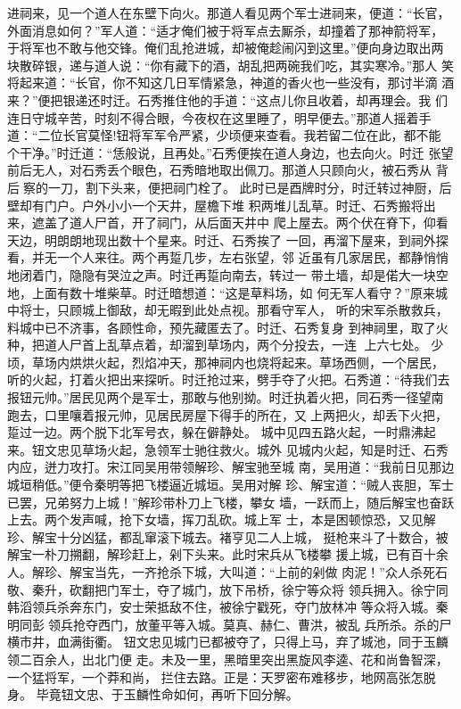进祠来，见一个道人在东壁下向火。那道人看见两个军士进祠来，便道：“长官，
外面消息如何？”军人道：“适才俺们被于将军点去厮杀，却撞着了那神箭将军，
于将军也不敢与他交锋。俺们乱抢进城，却被俺趁闹闪到这里。”便向身边取出两
块散碎银，递与道人说：“你有藏下的酒，胡乱把两碗我们吃，其实寒冷。”那人
笑将起来道：“长官，你不知这几日军情紧急，神道的香火也一些没有，那讨半滴
酒来？”便把银递还时迁。石秀推住他的手道：“这点儿你且收着，却再理会。我
们连日守城辛苦，时刻不得合眼，今夜权在这里睡了，明早便去。”那道人摇着手
道：“二位长官莫怪!钮将军军令严紧，少顷便来查看。我若留二位在此，都不能
个干净。”时迁道：“恁般说，且再处。”石秀便挨在道人身边，也去向火。时迁
张望前后无人，对石秀丢个眼色，石秀暗地取出佩刀。那道人只顾向火，被石秀从
背后察的一刀，割下头来，便把祠门栓了。
此时已是酉牌时分，时迁转过神厨，后壁却有门户。户外小小一个天井，屋檐下堆
积两堆儿乱草。时迁、石秀搬将出来，遮盖了道人尸首，开了祠门，从后面天井中
爬上屋去。两个伏在脊下，仰看天边，明朗朗地现出数十个星来。时迁、石秀挨了
一回，再溜下屋来，到祠外探看，并无一个人来往。两个再踅几步，左右张望，邻
近虽有几家居民，都静悄悄地闭着门，隐隐有哭泣之声。时迁再踅向南去，转过一
带土墙，却是偌大一块空地，上面有数十堆柴草。时迁暗想道：“这是草料场，如
何无军人看守？”原来城中将士，只顾城上御敌，却无暇到此处点视。那看守军人，
听的宋军杀散救兵，料城中已不济事，各顾性命，预先藏匿去了。时迁、石秀复身
到神祠里，取了火种，把道人尸首上乱草点着，却溜到草场内，两个分投去，一连
上六七处。
少顷，草场内烘烘火起，烈焰冲天，那神祠内也烧将起来。草场西侧，一个居民，
听的火起，打着火把出来探听。时迁抢过来，劈手夺了火把。石秀道：“待我们去
报钮元帅。”居民见两个是军士，那敢与他别拗。时迁执着火把，同石秀一径望南
跑去，口里嚷着报元帅，见居民房屋下得手的所在，又上两把火，却丢下火把，
踅过一边。两个脱下北军号衣，躲在僻静处。
城中见四五路火起，一时鼎沸起来。钮文忠见草场火起，急领军士驰往救火。城外
见城内火起，知是时迁、石秀内应，迸力攻打。宋江同吴用带领解珍、解宝驰至城
南，吴用道：“我前日见那边城垣稍低。”便令秦明等把飞楼逼近城垣。吴用对解
珍、解宝道：“贼人丧胆，军士已罢，兄弟努力上城！”解珍带朴刀上飞楼，攀女
墙，一跃而上，随后解宝也奋跃上去。两个发声喊，抢下女墙，挥刀乱砍。城上军
士，本是困顿惊恐，又见解珍、解宝十分凶猛，都乱窜滚下城去。褚亨见二人上城，
挺枪来斗了十数合，被解宝一朴刀搠翻，解珍赶上，剁下头来。此时宋兵从飞楼攀
援上城，已有百十余人。解珍、解宝当先，一齐抢杀下城，大叫道：“上前的剁做
肉泥！”众人杀死石敬、秦升，砍翻把门军士，夺了城门，放下吊桥，徐宁等众将
领兵拥入。徐宁同韩滔领兵杀奔东门，安士荣抵敌不住，被徐宁戳死，夺门放林冲
等众将入城。秦明同彭领兵抢夺西门，放董平等入城。莫真、赫仁、曹洪，被乱
兵所杀。杀的尸横市井，血满街衢。
钮文忠见城门已都被夺了，只得上马，弃了城池，同于玉麟领二百余人，出北门便
走。未及一里，黑暗里突出黑旋风李逵、花和尚鲁智深，一个猛将军，一个莽和尚，
拦住去路。正是：天罗密布难移步，地网高张怎脱身。
毕竟钮文忠、于玉麟性命如何，再听下回分解。